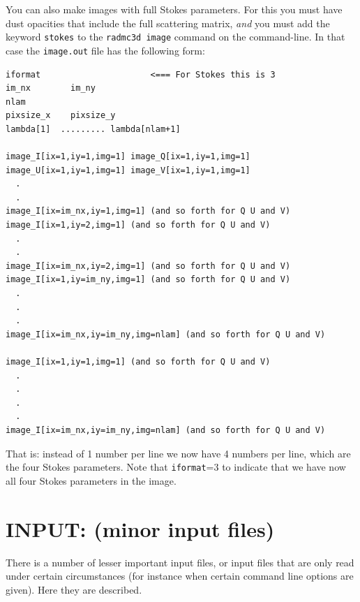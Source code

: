 \documentclass{report}
\newenvironment{asciibox}%
  {\begin{list}{}{%
    \setlength{\topsep}{0.5em}%
    \setlength{\parskip}{0em}%
    \setlength{\parsep}{0em}%
    \setlength{\itemsep}{0em}%
    \setlength{\rightmargin}{0em}%
    \setlength{\leftmargin}{3.0em}%
    \setlength{\labelsep}{1em}%
    \setlength{\labelwidth}{2em}%
  }\normalfont\footnotesize\item}
  {\end{list}}
\begin{document}
You can also make images with full Stokes parameters. For this you must have
dust opacities that include the full scattering matrix, {\em and} you must
add the keyword {\small\tt stokes} to the {\small\tt radmc3d image} command
on the command-line. In that case the {\small\tt image.out} file has the
following form:
\begin{asciibox}\begin{verbatim}
iformat                      <=== For Stokes this is 3 
im_nx        im_ny
nlam
pixsize_x    pixsize_y
lambda[1]  ......... lambda[nlam+1]

image_I[ix=1,iy=1,img=1] image_Q[ix=1,iy=1,img=1] image_U[ix=1,iy=1,img=1] image_V[ix=1,iy=1,img=1]
  .
  .
image_I[ix=im_nx,iy=1,img=1] (and so forth for Q U and V)
image_I[ix=1,iy=2,img=1] (and so forth for Q U and V)
  .
  .
image_I[ix=im_nx,iy=2,img=1] (and so forth for Q U and V)
image_I[ix=1,iy=im_ny,img=1] (and so forth for Q U and V)
  .
  .
  .
image_I[ix=im_nx,iy=im_ny,img=nlam] (and so forth for Q U and V)

image_I[ix=1,iy=1,img=1] (and so forth for Q U and V)
  .
  .
  .
  .
image_I[ix=im_nx,iy=im_ny,img=nlam] (and so forth for Q U and V)
\end{verbatim}\end{asciibox}
That is: instead of 1 number per line we now have 4 numbers per line, which
are the four Stokes parameters. Note that {\small\tt iformat}=3 to indicate
that we have now all four Stokes parameters in the image.


\section{INPUT: (minor input files)}\label{sec-minor-input-files}
There is a number of lesser important input files, or input files that are
only read under certain circumstances (for instance when certain command
line options are given). Here they are described.
\end{document}
